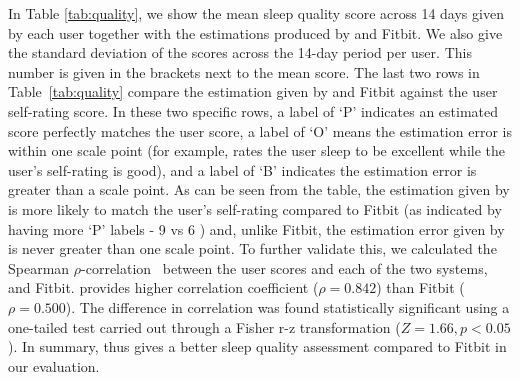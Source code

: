 In Table \ref{tab:quality}, we show the mean sleep quality score across 14 days given by each user together with the estimations produced by {\systemname} and Fitbit. We also give the standard deviation of the scores across the 14-day period per user. This number is given in the brackets next to the mean score. The last two rows in Table~\ref{tab:quality} compare the estimation given by {\systemname} and Fitbit against the user self-rating score. In these two specific rows, a label of `P' indicates an estimated score perfectly matches the user score, a label of `O' means the estimation error is within one scale point (for example, {\systemname} rates the user sleep to be excellent while the user's self-rating is good), and a label of `B' indicates the estimation error is greater than a scale point. As can be seen from the table, the estimation given by {\systemname} is more likely to match the user's self-rating compared to Fitbit (as indicated by having more `P' labels - 9 vs 6 ) and, unlike Fitbit, the estimation error given by {\systemname} is never greater than one scale point. To further validate this, we calculated the Spearman $\rho$-correlation~\cite{richardson2015nonparametric} between the user scores and each of the two systems, {\systemname} and Fitbit. {\systemname} provides higher correlation coefficient ($\rho = 0.842$) than Fitbit ($\rho = 0.500$). The difference in correlation was found statistically significant using a one-tailed test carried out through a Fisher r-z transformation ($Z = 1.66, p < 0.05$).  In summary, {\systemname} thus gives a better sleep quality assessment compared to Fitbit in our evaluation.

